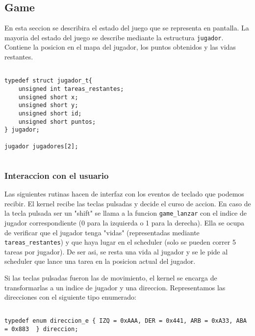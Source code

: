 
\subsection{Game}

\label{sec:game}

En esta seccion se describira el estado del juego que se representa en pantalla.
La mayoria del estado del juego se describe mediante la estructura \verb|jugador|. Contiene la posicion en el mapa del jugador, los puntos obtenidos y las vidas restantes.



\begin{verbatim}

typedef struct jugador_t{
	unsigned int tareas_restantes;
	unsigned short x;
	unsigned short y;
	unsigned short id;
	unsigned short puntos;
} jugador;

jugador jugadores[2];


\end{verbatim}


\subsubsection{Interaccion con el usuario}


Las siguientes rutinas hacen de interfaz con los eventos de teclado que podemos recibir. El kernel recibe las teclas pulsadas y decide el curso de accion. 
En caso de la tecla pulsada ser un "shift" se llama a la funcion \verb|game_lanzar| con el indice de jugador correspondiente (0 para la izquierda o 1 para la derecha). Ella se ocupa de verificar que el jugador tenga "vidas" (representadas mediante \verb|tareas_restantes|) y que haya lugar en el scheduler (solo se pueden correr 5 tareas por jugador). De ser asi, se resta una vida al jugador y se le pide al scheduler que lance una tarea en la posicion actual del jugador.

Si las teclas pulsadas fueron las de movimiento, el kernel se encarga de transformarlas a un indice de jugador y una direccion. Representamos las direcciones con el siguiente tipo enumerado:

\begin{verbatim}

typedef enum direccion_e { IZQ = 0xAAA, DER = 0x441, ARB = 0xA33, ABA = 0x883  } direccion;

\end{verbatim}

